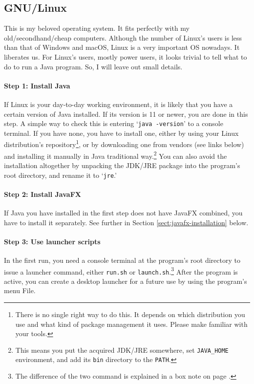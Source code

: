 
\subsection{GNU/Linux}

This is my beloved operating system. It fits perfectly with my old/secondhand/cheap computers. Although the number of Linux's users is less than that of Windows and macOS, Linux is a very important OS nowadays. It liberates us. For Linux's users, mostly power users, it looks trivial to tell what to do to run a Java program. So, I will leave out small details.

\paragraph{Step 1: Install Java} If Linux is your day-to-day working environment, it is likely that you have a certain version of Java installed. If its version is 11 or newer, you are done in this step. A simple way to check this is entering `\texttt{java -version}' to a console terminal. If you have none, you have to install one, either by using your Linux distribution's repository\footnote{There is no single right way to do this. It depends on which distribution you use and what kind of package management it uses. Please make familiar with your tools.}, or by downloading one from vendors (see links below) and installing it manually in Java traditional way.\footnote{This means you put the acquired JDK/JRE somewhere, set \texttt{JAVA\_HOME} environment, and add its \texttt{bin} directory to the \texttt{PATH}.} You can also avoid the installation altogether by unpacking the JDK/JRE package into the program's root directory, and rename it to `\texttt{jre}.'

\paragraph{Step 2: Install JavaFX} If Java you have installed in the first step does not have JavaFX combined, you have to install it separately. See further in Section \ref{sect:javafx-installation} below.

\paragraph{Step 3: Use launcher scripts} In the first run, you need a console terminal at the program's root directory to issue a launcher command, either \texttt{run.sh} or \texttt{launch.sh}.\footnote{The difference of the two command is explained in a box note on page \pageref{box:run-launch}.} After the program is active, you can create a desktop launcher for a future use by using the program's menu File.

